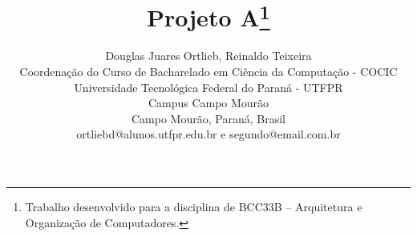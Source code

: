 \documentclass[times, 10pt,twocolumn]{article}
\begin{document}
\begin{savenotes}
\title{Projeto A\footnote{Trabalho desenvolvido para a disciplina de BCC33B – Arquitetura e Organização de Computadores.}}


\author{Douglas Juares Ortlieb, Reinaldo Teixeira\\
Coordenação do Curso de Bacharelado em Ciência da Computação - COCIC\\
Universidade Tecnológica Federal do Paraná - UTFPR\\ 
Campus Campo Mourão\\
Campo Mourão, Paraná, Brasil\\
ortliebd@alunos.utfpr.edu.br e segundo@email.com.br\\
}

\maketitle
\thispagestyle{empty}



\end{savenotes}


%

\end{document}
